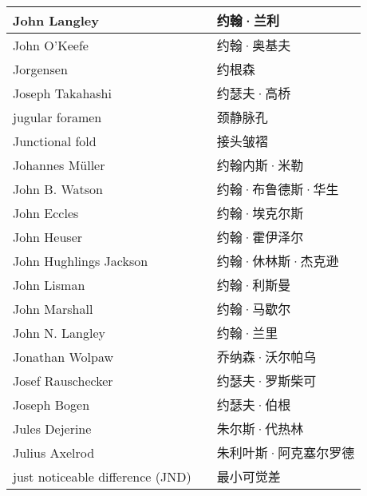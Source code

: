\begin{longtable}{lll}
	\midrule
	John Langley   && 约翰·兰利  \\
	
	\midrule
	John O’Keefe   && 约翰·奥基夫  \\
	
	\midrule
	Jorgensen   && 约根森  \\
	
	\midrule
	Joseph Takahashi   && 约瑟夫·高桥  \\
	
	\midrule
	jugular foramen   && 颈静脉孔  \\
	
	\midrule
	Junctional fold   && 接头皱褶  \\
	
	\midrule
	Johannes Müller   && 约翰内斯·米勒  \\
	
	\midrule
	John B. Watson   && 约翰·布鲁德斯·华生  \\
	
	\midrule
	John Eccles   && 约翰·埃克尔斯  \\
	
	\midrule
	John Heuser   && 约翰·霍伊泽尔  \\
	
	\midrule
	John Hughlings Jackson   && 约翰·休林斯·杰克逊  \\
	
	\midrule
	John Lisman   && 约翰·利斯曼  \\
	
	\midrule
	John Marshall   && 约翰·马歇尔  \\
	
	\midrule
	John N. Langley   && 约翰·兰里  \\
	
	\midrule
	Jonathan Wolpaw   && 乔纳森·沃尔帕乌  \\
	
	\midrule
	Josef Rauschecker   && 约瑟夫·罗斯柴可  \\
	
	\midrule
	Joseph Bogen   && 约瑟夫·伯根  \\
	
	\midrule
	Jules Dejerine   && 朱尔斯·代热林  \\
	
	\midrule
	Julius Axelrod   && 朱利叶斯·阿克塞尔罗德  \\
	
	\midrule
	just noticeable difference (JND)   && 最小可觉差  \\
	

\end{longtable}
